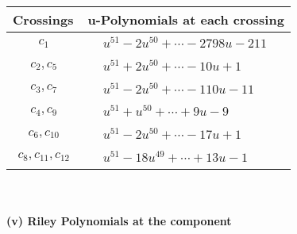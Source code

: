 \documentclass[1p]{elsarticle_modified}
\theoremstyle{definition}
\begin{document}
\begin{tabular}{m{50pt}|m{274pt}}
Crossings & \hspace{64pt}u-Polynomials at each crossing \\
\hline $$\begin{aligned}c_{1}\end{aligned}$$&$\begin{aligned}
&u^{51}-2 u^{50}+\cdots-2798 u-211
\end{aligned}$\\
\hline $$\begin{aligned}c_{2},c_{5}\end{aligned}$$&$\begin{aligned}
&u^{51}+2 u^{50}+\cdots-10 u+1
\end{aligned}$\\
\hline $$\begin{aligned}c_{3},c_{7}\end{aligned}$$&$\begin{aligned}
&u^{51}-2 u^{50}+\cdots-110 u-11
\end{aligned}$\\
\hline $$\begin{aligned}c_{4},c_{9}\end{aligned}$$&$\begin{aligned}
&u^{51}+u^{50}+\cdots+9 u-9
\end{aligned}$\\
\hline $$\begin{aligned}c_{6},c_{10}\end{aligned}$$&$\begin{aligned}
&u^{51}-2 u^{50}+\cdots-17 u+1
\end{aligned}$\\
\hline $$\begin{aligned}c_{8},c_{11},c_{12}\end{aligned}$$&$\begin{aligned}
&u^{51}-18 u^{49}+\cdots+13 u-1
\end{aligned}$\\
\hline
\end{tabular}\\~\\
\newpage\renewcommand{\arraystretch}{1}
\flushleft \textbf{(v) Riley Polynomials at the component}\newline \\
\end{document}
